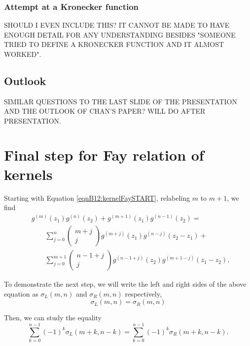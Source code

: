 \subsection{Attempt at a Kronecker function}
\cite{Cha22}
SHOULD I EVEN INCLUDE THIS?
IT CANNOT BE MADE TO HAVE ENOUGH DETAIL FOR ANY UNDERSTANDING BESIDES "SOMEONE TRIED TO DEFINE A KRONECKER FUNCTION AND IT ALMOST WORKED".

\section{Outlook}
SIMILAR QUESTIONS TO THE LAST SLIDE OF THE PRESENTATION AND THE OUTLOOK OF CHAN'S PAPER?
WILL DO AFTER PRESENTATION.




\appendix

\chapter{Final step for Fay relation of kernels}\label{appB12:kernelFay}

Starting with Equation \ref{eqnB12:kernelFaySTART}, relabeling $m$ to $m+1$, we find
\begin{align}
    & g^{(m)}(z_1)g^{(n)}(z_2)+g^{(m+1)}(z_1)g^{(n-1)}(z_2) =
    \\ & \quad \quad \sum_{j=0}^{n} \begin{pmatrix} m+j \\ j \end{pmatrix} g^{(m+j)}(z_1) g^{(n-j)}(z_2-z_1) +
    \\ & \quad \quad \sum_{j=0}^{m+1} \begin{pmatrix} n-1+j \\ j \end{pmatrix} g^{(n-1+j)}(z_2) g^{(m+1-j)}(z_1-z_2),
\end{align}

To demonstrate the next step, we will write the left and right sides of the above equation as
$\sigma_{L}(m,n)$ and $\sigma_{R}(m,n)$ respectively,
\begin{equation}
    \sigma_L(m,n) = \sigma_R(m,n)
\end{equation}


Then, we can study the equality
\begin{equation}
    \sum_{k=0}^{n-1} (-1)^k \sigma_L(m+k,n-k) = \sum_{k=0}^{n-1} (-1)^k \sigma_R(m+k,n-k).\label{eqnB12:kernelFayMASTER}
\end{equation}

